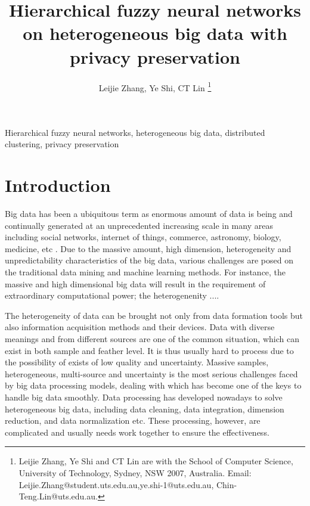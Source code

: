 \documentclass[journal,twocolumn,10pt]{IEEEtran}
\begin{document}
\title{Hierarchical fuzzy neural networks on heterogeneous big data with privacy preservation}
\author{Leijie Zhang, Ye Shi, CT Lin
\thanks{Leijie Zhang, Ye Shi and CT Lin are with the School of Computer Science, University of Technology, Sydney, NSW 2007, Australia. Email:
\textsf{Leijie.Zhang@student.uts.edu.au},\textsf{ye.shi-1@uts.edu.au}, \textsf{Chin-Teng.Lin@uts.edu.au}.}
}
\date{}
\maketitle
\begin{abstract}

\end{abstract}

\begin{IEEEkeywords}
Hierarchical fuzzy neural networks, heterogeneous big data, distributed clustering, privacy preservation
\end{IEEEkeywords}

\section{Introduction}
Big data has been a ubiquitous term as enormous amount of
data is being and continually generated at an unprecedented
increasing scale in many areas including social networks, internet of things, commerce, astronomy, biology, medicine, etc \cite{qiu2016survey, tran2019privacy}. Due to the massive amount, high dimension, heterogeneity and unpredictability characteristics of the big data, various challenges are posed on the traditional data mining and machine learning methods. For instance, the massive and high dimensional big data will result in the requirement of extraordinary computational power; the heterogenenity ....

The heterogeneity of data can be brought not only from data formation tools but also information acquisition methods and their devices. Data with diverse meanings and from different sources are one of the common situation, which can exist in both sample and feather level. It is thus usually hard to process due to the possibility of exists of low quality and uncertainty. Massive samples, heterogeneous, multi-source and uncertainty is the most serious challenges faced by big data processing models, dealing with which has become one of the keys to handle big data smoothly. Data processing has developed nowadays to solve heterogeneous big data, including data cleaning, data integration, dimension reduction, and data normalization etc. These processing, however, are complicated and usually needs work together to ensure the effectiveness.
\end{document}
